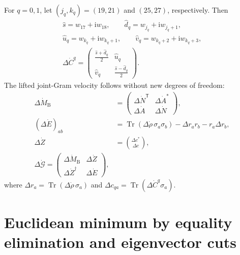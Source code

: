 \documentclass[10pt,twocolumn]{article}
\newcommand{\ii}{\mathrm i}
\newcommand{\Tr}{\operatorname{Tr}}
\newcommand{\MB}{M_{\mathrm B}}
\begin{document}
For $q=0,1$, let $(j_q,k_q)=(19,21)$ and $(25,27)$, respectively.  Then
\begin{equation}
\begin{gathered}
\widehat s=w_{17}+\ii w_{18},\qquad
\widehat d_q=w_{j_q}+\ii w_{j_q+1},\\
\widehat u_q=w_{k_q}+\ii w_{k_q+1},\qquad
\widehat v_q=w_{k_q+2}+\ii w_{k_q+3},\\
\Delta\dot C^q=
\begin{pmatrix}
\frac{\widehat s+\widehat d_q}{2}&\widehat u_q\\
\widehat v_q&\frac{\widehat s-\widehat d_q}{2}
\end{pmatrix}.
\end{gathered}
\label{eq:lift-c}
\end{equation}
The lifted joint-Gram velocity follows without new degrees of freedom:
\begin{equation}
\begin{aligned}
\Delta\dot\MB&=\begin{pmatrix}
\Delta\dot N^{\mathsf T}&\Delta\dot A^*\\
\Delta\dot A&\Delta\dot N
\end{pmatrix},\\
(\Delta\dot E)_{ab}&=\Tr(\Delta\dot\rho\,\sigma_a\sigma_b)
-\Delta r_ar_b-r_a\Delta r_b,\\
\Delta\dot Z&=\binom{\Delta c^*}{\Delta c},\\
\Delta\dot{\mathcal G}=\begin{pmatrix}
\Delta\dot\MB&\Delta\dot Z\\
\Delta\dot Z^\dagger&\Delta\dot E
\end{pmatrix},
\end{aligned}
\label{eq:joint-lift}
\end{equation}
where $\Delta r_a=\Tr(\Delta\dot\rho\,\sigma_a)$ and
$\Delta c_{qa}=\Tr(\Delta\dot C^q\sigma_a)$.

\section{Euclidean minimum by equality elimination and eigenvector cuts}
\label{app:minimum-solution}
\end{document}

